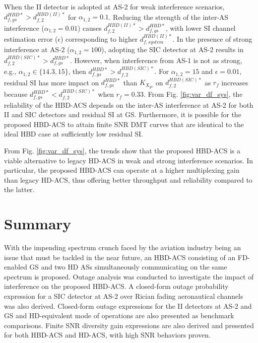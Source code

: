When the II detector is adopted at AS-2 for weak interference scenarios, $d_{f,gs}^{HBD*} > d_{f,2}^{HBD(II)*}$ for $\alpha_{1,2}=0.1$. Reducing the strength of the inter-AS interference ($\alpha_{1,2}=0.01$) causes $d_{f,2}^{HBD(II)*} > d_{f,gs}^{HBD*}$, with lower SI channel estimation error ($\epsilon $) corresponding to higher $d_{f,system}^{HBD(II)*}$. In the presence of strong interference at AS-2 ($\alpha_{1,2}=100$), adopting the SIC detector at AS-2 results in $d_{f,2}^{HBD(SIC)*} > d_{f,gs}^{HBD*}$. However, when interference from AS-1 is not as strong, e.g., $\alpha_{1,2} \in \{14.3, 15\}$, then $d_{f,gs}^{HBD*} > d_{f,2}^{HBD(SIC)*}$. For $\alpha_{1,2}=15$ and $\epsilon = 0.01$, residual SI has more impact on $d_{f,gs}^{HBD*}$ than $K_{X_{gs}}$ on $d_{f,2}^{HBD(SIC)*}$ as $r_f$ increases because $d_{f,gs}^{HBD*} < d_{f,2}^{HBD(SIC)*}$ when $r_f = 0.33$. From Fig. \ref{fig:var_df_sys}, the reliability of the HBD-ACS depends on the inter-AS interference at AS-2 for both II and SIC detectors and residual SI at GS. Furthermore, it is possible for the proposed HBD-ACS to attain finite SNR DMT curves that are identical to the ideal HBD case at sufficiently low residual SI.

From Fig. \ref{fig:var_df_sys}, the trends show that the proposed HBD-ACS is a viable alternative to legacy HD-ACS in weak and strong interference scenarios. In particular, the proposed HBD-ACS can operate at a higher multiplexing gain than legacy HD-ACS, thus offering better throughput and reliability compared to the latter.

\section{Summary} \label{section:summary}

With the impending spectrum crunch faced by the aviation industry being an issue that must be tackled in the near future, an HBD-ACS consisting of an FD-enabled GS and two HD ASs simultaneously communicating on the same spectrum is proposed. Outage analysis was conducted to investigate the impact of interference on the proposed HBD-ACS. A closed-form outage probability expression for a SIC detector at AS-2 over Rician fading aeronautical channels was also derived. Closed-form outage expressions for the II detectors at AS-2 and GS and HD-equivalent mode of operations are also presented as benchmark comparisons. Finite SNR diversity gain expressions are also derived and presented for both HBD-ACS and HD-ACS, with high SNR behaviors proven. 

